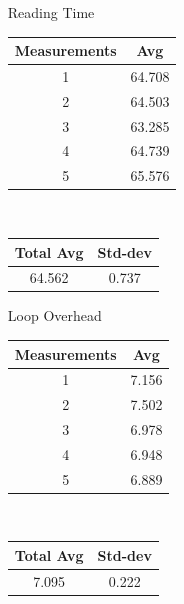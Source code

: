 \begin{enumerate}
    \item [Reading Time]
        \begin{center}
            \begin{tabular}{||c c||} 
             \hline
             Measurements & Avg \\ [0.5ex] 
             \hline\hline
             1 & 64.708  \\ 
             \hline
             2 & 64.503  \\ 
             \hline
             3 & 63.285  \\ 
             \hline
             4 & 64.739 \\ 
             \hline
             5 & 65.576  \\ 
             \hline
             \hline
            \end{tabular} \\
            \begin{tabular}{||c c||} 
             \hline
             Total Avg & Std-dev \\ [0.5ex] 
             \hline\hline
             64.562 & 0.737 \\ 
             \hline
             \hline
            \end{tabular}
        \end{center}
    \item [Loop Overhead]
        \begin{center}
            \begin{tabular}{||c c||} 
                 \hline
                 Measurements & Avg \\ [0.5ex] 
                 \hline\hline
                 1 & 7.156  \\ 
                 \hline
                 2 & 7.502  \\ 
                 \hline
                 3 & 6.978  \\ 
                 \hline
                 4 & 6.948 \\ 
                 \hline
                 5 & 6.889  \\ 
                 \hline
                 \hline
            \end{tabular} \\
            \begin{tabular}{||c c||} 
                 \hline
                 Total Avg & Std-dev \\ [0.5ex] 
                 \hline\hline
                 7.095 & 0.222 \\ 
                 \hline
                \hline
            \end{tabular}
        \end{center}
\end{enumerate}

